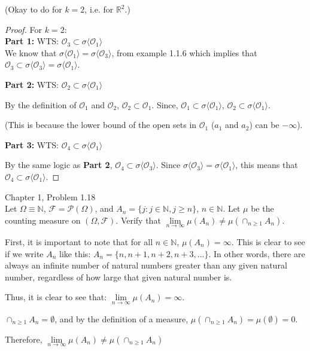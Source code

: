 \documentclass[12pt,letterpaper, onecolumn]{exam}
\newcommand{\real}{\mathbb{R}}
\newcommand{\nat}{\mathbb{N}}
\newcommand{\power}{\mathcal{P}}
\newcommand{\cutelim}{\lim\limits_{n\to\infty}}
\newcommand{\sigmaF}{\mathcal{F}}
\newcommand{\calO}{\mathcal{O}}
\newcommand{\gensig}[1]{\sigma\langle #1 \rangle} %
\begin{document}
\begin{questions}
     (Okay to do for $k = 2$, i.e. for $\real^2$.)
    \begin{solution}
    \begin{proof}
        For $k = 2$:\\
        \textbf{Part 1:} WTS: $\calO_3 \subset \gensig{\calO_1}$ \\
        We know that $\gensig{\calO_1} = \gensig{\calO_3}$, from example 1.1.6 which implies that \\ $\calO_3 \subset \gensig{\calO_3} = \gensig{\calO_1}$. 
        
        \textbf{Part 2:} WTS: $\calO_2 \subset \gensig{\calO_1}$

        By the definition of $\calO_1$ and $\calO_2$, $\calO_2 \subset \calO_1$. Since, $\calO_1 \subset \gensig{\calO_1}$, $\calO_2 \subset \gensig{\calO_1}$.

        (This is because the lower bound of the open sets in $\calO_1$ ($a_1$ and $a_2$) can be $-\infty$). 

        \textbf{Part 3:} WTS: $\calO_4 \subset \gensig{\calO_1}$

        By the same logic as \textbf{Part 2}, $\calO_4 \subset \gensig{\calO_3}$. Since $\gensig{\calO_3} = \gensig{\calO_1}$, this means that $\calO_4 \subset \gensig{\calO_1}$.
    \end{proof}
    \end{solution}

    \question Chapter 1, Problem 1.18 \\
    Let $\Omega \equiv \nat$, $\sigmaF = \power(\Omega)$, and $A_n = \{j : j \in \nat,j \geq n\}$, $n \in \nat$. Let $\mu$ be the counting measure on $(\Omega, \sigmaF)$. Verify that $\cutelim \mu(A_n) \neq \mu(\cap_{n\geq 1} A_n)$.

    \begin{solution}
    First, it is important to note that for all $n \in \nat$, $\mu(A_n) = \infty$. This is clear to see if we write $A_n $ like this: $A_n = \{n, n+1, n+2, n+3, ... \}$. In other words, there are always an infinite number of natural numbers greater than any given natural number, regardless of how large that given natural number is. 

    Thus, it is clear to see that: $\cutelim \mu(A_n) = \infty$.

    $\cap_{n\geq 1} A_n = \emptyset$, and by the definition of a measure, $\mu(\cap_{n\geq 1} A_n) = \mu(\emptyset) = 0.$

    Therefore,  $\cutelim \mu(A_n) \neq \mu(\cap_{n\geq 1} A_n)$
    \end{solution}


\end{questions}
\end{document}
